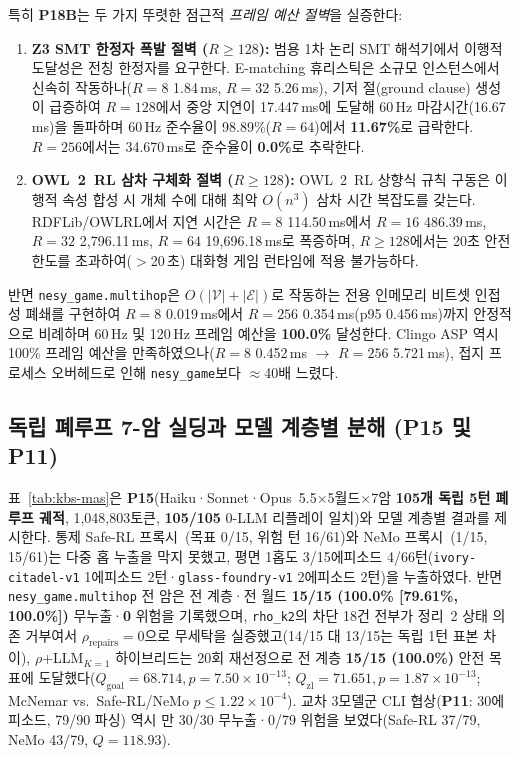 특히 \textbf{P18B}는 두 가지 뚜렷한 점근적 \textit{프레임 예산 절벽}을 실증한다:
\begin{enumerate}
\item \textbf{Z3 SMT 한정자 폭발 절벽 ($R \ge 128$):} 범용 1차 논리 SMT 해석기에서 이행적 도달성은 전칭 한정자를 요구한다. E-matching 휴리스틱은 소규모 인스턴스에서 신속히 작동하나($R{=}8$ 1.84\,ms, $R{=}32$ 5.26\,ms), 기저 절(ground clause) 생성이 급증하여 $R{=}128$에서 중앙 지연이 17.447\,ms에 도달해 60\,Hz 마감시간(16.67\,ms)을 돌파하며 60\,Hz 준수율이 98.89\%($R{=}64$)에서 \textbf{11.67\%}로 급락한다. $R{=}256$에서는 34.670\,ms로 준수율이 \textbf{0.0\%}로 추락한다.
\item \textbf{OWL~2~RL 삼차 구체화 절벽 ($R \ge 128$):} OWL~2~RL 상향식 규칙 구동은 이행적 속성 합성 시 개체 수에 대해 최악 $O(n^3)$ 삼차 시간 복잡도를 갖는다. RDFLib/OWLRL에서 지연 시간은 $R{=}8$ 114.50\,ms에서 $R{=}16$ 486.39\,ms, $R{=}32$ 2,796.11\,ms, $R{=}64$ 19,696.18\,ms로 폭증하며, $R \ge 128$에서는 20초 안전 한도를 초과하여($>$20\,초) 대화형 게임 런타임에 적용 불가능하다.
\end{enumerate}
반면 \texttt{nesy\_game.multihop}은 $O(|\mathcal{V}| + |\mathcal{E}|)$로 작동하는 전용 인메모리 비트셋 인접성 폐쇄를 구현하여 $R{=}8$ 0.019\,ms에서 $R{=}256$ 0.354\,ms(p95 0.456\,ms)까지 안정적으로 비례하며 60\,Hz 및 120\,Hz 프레임 예산을 \textbf{100.0\%} 달성한다. Clingo ASP 역시 100\% 프레임 예산을 만족하였으나($R{=}8$ 0.452\,ms $\to$ $R{=}256$ 5.721\,ms), 접지 프로세스 오버헤드로 인해 \texttt{nesy\_game}보다 $\approx$40배 느렸다.

\subsection{독립 폐루프 7-암 실딩과 모델 계층별 분해 (\textbf{P15} 및 \textbf{P11})}\label{sec:kbs-mas}
표~\ref{tab:kbs-mas}은 \textbf{P15}(Haiku·Sonnet·Opus~5.5$\times$5월드$\times$7암 \textbf{105개 독립 5턴 폐루프 궤적}, 1,048,803토큰, \textbf{105/105} 0-LLM 리플레이 일치)와 모델 계층별 결과를 제시한다. 통제 Safe-RL 프록시~\cite{alshiekh2018shield}(목표 0/15, 위험 턴 16/61)와 NeMo 프록시~\cite{rebedea2023nemo}(1/15, 15/61)는 다중 홉 누출을 막지 못했고, 평면 1홉도 3/15에피소드 4/66턴(\texttt{ivory-citadel-v1} 1에피소드 2턴·\texttt{glass-foundry-v1} 2에피소드 2턴)을 누출하였다. 반면 \texttt{nesy\_game.multihop} 전 암은 전 계층·전 월드 \textbf{15/15 (100.0\% [79.61\%, 100.0\%])} 무누출·\textbf{0} 위험을 기록했으며, \texttt{rho\_k2}의 차단 18건 전부가 정리~2 상태 의존 거부여서 $\rho_{\mathrm{repairs}}{=}0$으로 무세탁을 실증했고(14/15 대 13/15는 독립 1턴 표본 차이), $\rho$+LLM$_{K=1}$ 하이브리드는 20회 재선정으로 전 계층 \textbf{15/15 (100.0\%)} 안전 목표에 도달했다($Q_{\mathrm{goal}}{=}68.714, p{=}7.50{\times}10^{-13}$; $Q_{\mathrm{zl}}{=}71.651, p{=}1.87{\times}10^{-13}$; McNemar vs.\ Safe-RL/NeMo $p{\le}1.22{\times}10^{-4}$). 교차 3모델군 CLI 협상(\textbf{P11}: 30에피소드, 79/90 파싱) 역시 \system{}만 30/30 무누출·0/79 위험을 보였다(Safe-RL 37/79, NeMo 43/79, $Q{=}118.93$).

